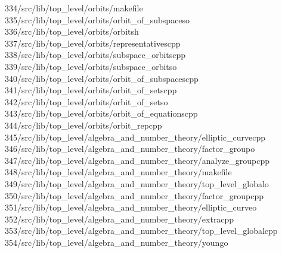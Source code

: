 \begin{tabbing}
334\>/src/lib/top\_level/orbits/makefile\\[0pt]
335\>/src/lib/top\_level/orbits/orbit\_of\_subspaceso\\[0pt]
336\>/src/lib/top\_level/orbits/orbitsh\\[0pt]
337\>/src/lib/top\_level/orbits/representativescpp\\[0pt]
338\>/src/lib/top\_level/orbits/subspace\_orbitscpp\\[0pt]
339\>/src/lib/top\_level/orbits/subspace\_orbitso\\[0pt]
340\>/src/lib/top\_level/orbits/orbit\_of\_subspacescpp\\[0pt]
341\>/src/lib/top\_level/orbits/orbit\_of\_setscpp\\[0pt]
342\>/src/lib/top\_level/orbits/orbit\_of\_setso\\[0pt]
343\>/src/lib/top\_level/orbits/orbit\_of\_equationscpp\\[0pt]
344\>/src/lib/top\_level/orbits/orbit\_repcpp\\[0pt]
345\>/src/lib/top\_level/algebra\_and\_number\_theory/elliptic\_curvecpp\\[0pt]
346\>/src/lib/top\_level/algebra\_and\_number\_theory/factor\_groupo\\[0pt]
347\>/src/lib/top\_level/algebra\_and\_number\_theory/analyze\_groupcpp\\[0pt]
348\>/src/lib/top\_level/algebra\_and\_number\_theory/makefile\\[0pt]
349\>/src/lib/top\_level/algebra\_and\_number\_theory/top\_level\_globalo\\[0pt]
350\>/src/lib/top\_level/algebra\_and\_number\_theory/factor\_groupcpp\\[0pt]
351\>/src/lib/top\_level/algebra\_and\_number\_theory/elliptic\_curveo\\[0pt]
352\>/src/lib/top\_level/algebra\_and\_number\_theory/extracpp\\[0pt]
353\>/src/lib/top\_level/algebra\_and\_number\_theory/top\_level\_globalcpp\\[0pt]
354\>/src/lib/top\_level/algebra\_and\_number\_theory/youngo\\[0pt]

\end{tabbing}
